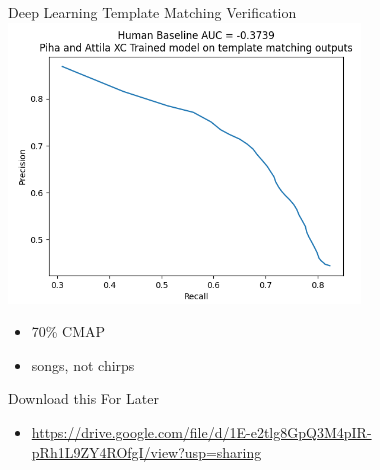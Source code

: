 \begin{frame}{Deep Learning Template Matching Verification}
    \centering
    \includegraphics[height=0.7\textheight,width=0.7\textwidth,keepaspectratio]{images/TMV-precision-recall.png}
    \begin{itemize}
        \item 70\% CMAP
        \item songs, not chirps
    \end{itemize}
\end{frame}

\begin{frame}{Download this For Later}
    \begin{itemize}
        \item \url{https://drive.google.com/file/d/1E-e2tlg8GpQ3M4pIR-pRh1L9ZY4ROfgI/view?usp=sharing}
    \end{itemize}
\end{frame}

